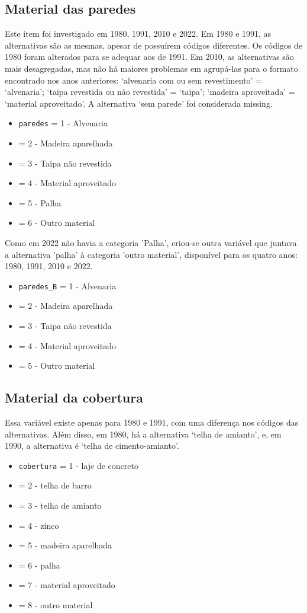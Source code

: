 \documentclass[12pt,a4paper]{article}
\newcommand{\vr}[1]{\texttt{#1}}
\begin{document}
\subsection{Material das paredes}\label{sec:c3}
Este item foi investigado em 1980, 1991, 2010 e 2022. Em 1980 e 1991, as alternativas são as mesmas, apesar de possuírem códigos diferentes. Os códigos de 1980 foram alterados para se adequar aos de 1991. Em 2010, as alternativas são mais desagregadas, mas não há maiores problemas em agrupá-las para o formato encontrado nos anos anteriores: ‘alvenaria com ou sem revestimento’ = ‘alvenaria’; ‘taipa revestida ou não revestida’ = ‘taipa’; ‘madeira aproveitada’ = ‘material aproveitado’. A alternativa ‘sem parede’ foi considerada missing.
\begin{itemize}
  \item \vr{paredes} = 1 - Alvenaria
  \item = 2 - Madeira aparelhada
  \item = 3 - Taipa não revestida
  \item = 4 - Material aproveitado
  \item = 5 - Palha
  \item = 6 - Outro material
\end{itemize}

Como em 2022 não havia a categoria 'Palha', criou-se outra variável que juntava a alternativa 'palha' à categoria 'outro material', disponível para os quatro anos: 1980, 1991, 2010 e 2022.
\begin{itemize}
  \item \vr{paredes\_B} = 1 - Alvenaria
  \item = 2 - Madeira aparelhada
  \item = 3 - Taipa não revestida
  \item = 4 - Material aproveitado
  \item = 5 - Outro material
\end{itemize}

\subsection{Material da cobertura}\label{sec:c4}
Essa variável existe apenas para 1980 e 1991, com uma diferença nos códigos das alternativas. Além disso, em 1980, há a alternativa ‘telha de amianto’, e, em 1990, a alternativa é ‘telha de cimento-amianto’.
\begin{itemize}
  \item \vr{cobertura} = 1 - laje de concreto
  \item = 2 - telha de barro
  \item = 3 - telha de amianto
  \item = 4 - zinco
  \item = 5 - madeira aparelhada
  \item = 6 - palha
  \item = 7 - material aproveitado
  \item = 8 - outro material
\end{itemize}
\end{document}
